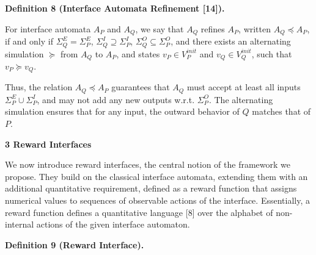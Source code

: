 \documentclass[10pt,a4paper]{article}
\begin{document}
 
 
\par\medskip\noindent\textbf{Definition 8 (Interface Automata Refinement [14]).}\par
 
 
For interface automata $A_{P}$ and $A_{Q}$, we say that $A_{Q}$ refines $A_{P}$, written $A_{Q}\preceq A_{P}$, if and only if $\Sigma_{Q}^{E}=\Sigma_{P}^{E}$, $\Sigma_{Q}^{I}\supseteq\Sigma_{P}^{I}$, $\Sigma_{Q}^{O}\subseteq\Sigma_{P}^{O}$, and there exists an alternating simulation $\succeq$ from $A_{Q}$ to $A_{P}$, and states $v_{P}\in V_{P}^{init}$ and $v_{Q}\in V_{Q}^{init}$, such that $v_{P}\succeq v_{Q}$.\par
 
 
 
 
Thus, the relation $A_{Q}\preceq A_{P}$ guarantees that $A_{Q}$ must accept at least all inputs $\Sigma_{P}^{E}\cup\Sigma_{P}^{I}$, and may not add any new outputs w.r.t. $\Sigma_{P}^{O}$. The alternating simulation ensures that for any input, the outward behavior of $Q$ matches that of $P$.\par
 
  
 


 
\par\medskip\noindent\textbf{3 Reward Interfaces}\par
 
 
We now introduce reward interfaces, the central notion of the framework we propose. They build on the classical interface automata, extending them with an additional quantitative requirement, defined as a reward function that assigns numerical values to sequences of observable actions of the interface. Essentially, a reward function defines a quantitative language [8] over the alphabet of non-internal actions of the given interface automaton.\par
 
 
 
\par\medskip\noindent\textbf{Definition 9 (Reward Interface).}\par
 
\end{document}
